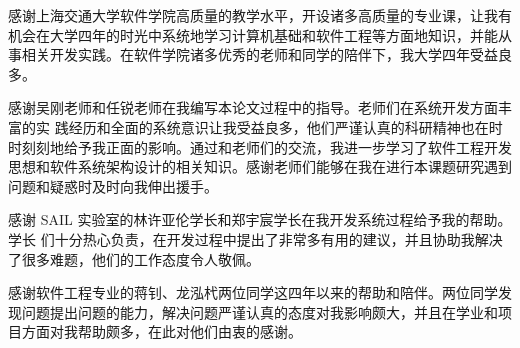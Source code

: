 
\begin{acknowledgements}
  感谢上海交通大学软件学院高质量的教学水平，开设诸多高质量的专业课，让我有机会在大学四年的时光中系统地学习计算机基础和软件工程等方面地知识，并能从事相关开发实践。在软件学院诸多优秀的老师和同学的陪伴下，我大学四年受益良多。

  感谢吴刚老师和任锐老师在我编写本论文过程中的指导。老师们在系统开发方面丰富的实
  践经历和全面的系统意识让我受益良多，他们严谨认真的科研精神也在时时刻刻地给予我正面的影响。通过和老师们的交流，我进一步学习了软件工程开发思想和软件系统架构设计的相关知识。感谢老师们能够在我在进行本课题研究遇到问题和疑惑时及时向我伸出援手。

  感谢 SAIL 实验室的林许亚伦学长和郑宇宸学长在我开发系统过程给予我的帮助。学长
  们十分热心负责，在开发过程中提出了非常多有用的建议，并且协助我解决了很多难题，他们的工作态度令人敬佩。

  感谢软件工程专业的蒋钊、龙泓杙两位同学这四年以来的帮助和陪伴。两位同学发现问题提出问题的能力，解决问题严谨认真的态度对我影响颇大，并且在学业和项目方面对我帮助颇多，在此对他们由衷的感谢。
\end{acknowledgements}
